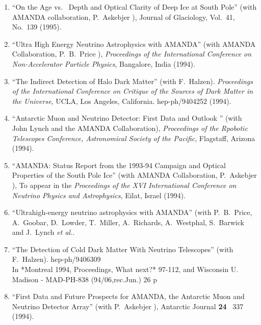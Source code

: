 \begin{enumerate}
\item ``On the Age vs.~ Depth and Optical Clarity of Deep
        Ice at South   Pole'' (with AMANDA collaboration,
        P.~Askebjer \etal), Journal of   Glaciology,
        Vol.~41, No.~139 (1995).

\item ``Ultra High Energy Neutrino Astrophysics with
        AMANDA'' (with AMANDA   Collaboration, P.~B.~Price
        \etal), {\it Proceedings of the     International
        Conference on Non-Accelerator Particle Physics},
        Bangalore, India (1994).

\item ``The Indirect Detection of Halo Dark Matter'' (with
        F.~Halzen).   {\it Proceedings of the International
        Conference on Critique of the     Sources of Dark
        Matter in the Universe}, UCLA, Los Angeles,
        California. hep-ph/9404252 (1994).

\item ``Antarctic Muon and Neutrino Detector: First Data and
        Outlook  '' (with John Lynch and the AMANDA
        Collaboration), {\it Proceedings of   the Rpobotic
        Telescopes Conference, Astronomical Society of the
        Pacific}, Flagstaff, Arizona (1994).

\item ``AMANDA: Status Report from the 1993-94 Campaign and
        Optical   Properties of the South Pole Ice'' (with
        AMANDA Collaboration,   P.~Askebjer \etal), To
        appear in the {\it Proceedings of the XVI
        International Conference on Neutrino Physics and
        Astrophysics},   Eilat, Israel (1994).

\item ``Ultrahigh-energy neutrino astrophysics with AMANDA''
        (with P.~B.~Price, A.~Goobar, D.~Lowder, T.~Miller,
        A.~Richards, A.~Westphal, S.~Barwick and J.~Lynch
        {\it et al.}. %

\item ``The Detection of Cold Dark Matter With Neutrino
        Telescopes'' (with F.~Halzen). hep-ph/9406309
        \\{}In *Montreal 1994, Proceedings, What next?*
        97-112, and Wisconsin U. Madison - MAD-PH-838
        (94/06,rec.Jun.) 26 p %

\item ``First Data and Future Prospects for AMANDA, the
        Antarctic Muon   and Neutrino Detector Array'' (with
        P.~Askebjer \etal), Antarctic   Journal {\bf 24} \,
        337 (1994).


\end{enumerate}
